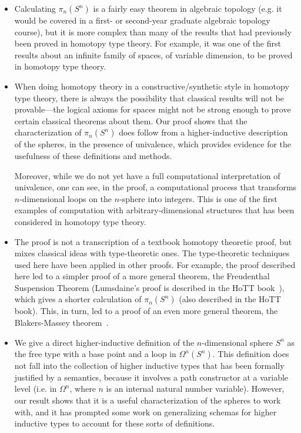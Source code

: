 \begin{itemize}

\item Calculating $\pi_n(S^n)$ is a fairly easy theorem in algebraic
  topology (e.g. it would be covered in a first- or second-year graduate
  algebraic topology course), but it is more complex than many of the
  results that had previously been proved in homotopy type theory.  For
  example, it was one of the first results about an infinite family of
  spaces, of variable dimension, to be proved in homotopy type theory.

\item When doing homotopy theory in a constructive/synthetic
  style in homotopy type theory, there is always the possibility that
  classical results will not be provable---the logical axioms for spaces
  might not be strong enough to prove certain classical theorems about them.
  Our proof shows that the characterization of $\pi_n(S^n)$ does follow
  from a higher-inductive description of the spheres, in the presence of
  univalence, which provides evidence for the usefulness of
  these definitions and methods.  

  Moreover, while we do not yet have a full computational interpretation
  of univalence, one can see, in the proof, a computational process that
  transforms $n$-dimensional loops on the $n$-sphere into integers.
  This is one of the first examples of computation with
  arbitrary-dimensional structures that has been considered in homotopy
  type theory.  

\item The proof is not a transcription of a textbook homotopy theoretic
  proof, but mixes classical ideas with type-theoretic ones.  
  The type-theoretic techniques used here have been applied in other
  proofs.  For example, the proof described here led to a simpler proof
  of a more general theorem, the Freudenthal Suspension Theorem
  (Lumsdaine's proof is described in the HoTT book~\citep{uf13hott-book}), which
  gives a shorter calculation of $\pi_n(S^n)$ (also described in the
  HoTT book).  This, in turn, led to a proof of an even more general
  theorem, the Blakers-Massey theorem~\citep{fll13blakersmassey}.  

\item We give a direct higher-inductive definition of the
  $n$-dimensional sphere $S^n$ as the free type with a base point
   and a loop in $\Omega^n(S^n)$.  This definition does not
  fall into the collection of higher inductive types that has been
  formally justified by a semantics, because it involves a path
  constructor at a variable level (i.e. in $\Omega^n$, where $n$ is an
  internal natural number variable).  However, our result shows that it is a useful
  characterization of the spheres to work with, and it has prompted some
  work on generalizing schemas for higher inductive types to account for
  these sorts of definitions.


\end{itemize}
